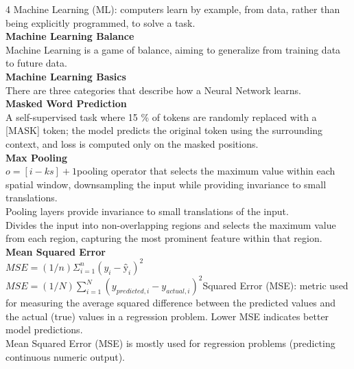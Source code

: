 \documentclass[8pt]{extarticle}
\begin{document}
\begin{multicols}{4}
{Machine Learning (ML): computers learn by example, from data, rather than being explicitly programmed, to solve a task.\\
\vspace{2pt}\textbf{Machine Learning Balance}\\
Machine Learning is a game of balance, aiming to generalize from training data to future data.\\
\vspace{2pt}\textbf{Machine Learning Basics}\\
There are three categories that describe how a Neural Network learns.\\
\vspace{2pt}\textbf{Masked Word Prediction}\\
A self-supervised task where 15 \% of tokens are randomly replaced with a [MASK] token; the model predicts the original token using the surrounding context, and loss is computed only on the masked positions.\\
\vspace{2pt}\textbf{Max Pooling}\\
$o = [i - k s] + 1$\A pooling operator that selects the maximum value within each spatial window, downsampling the input while providing invariance to small translations.\\
Pooling layers provide invariance to small translations of the input.\\
Divides the input into non-overlapping regions and selects the maximum value from each region, capturing the most prominent feature within that region.\\
\vspace{2pt}\textbf{Mean Squared Error}\\
$MSE = (1/n) \Sigma_{i=1}^{n} (y_i - ŷ_i)^2$\\
$MSE = (1/N) \sum_{i=1}^{N} (y_{predicted,i} - y_{actual,i})^2$\Mean Squared Error (MSE): metric used for measuring the average squared difference between the predicted values and the actual (true) values in a regression problem. Lower MSE indicates better model predictions.\\
Mean Squared Error (MSE) is mostly used for regression problems (predicting continuous numeric output).\\

}
\end{multicols}
\end{document}
